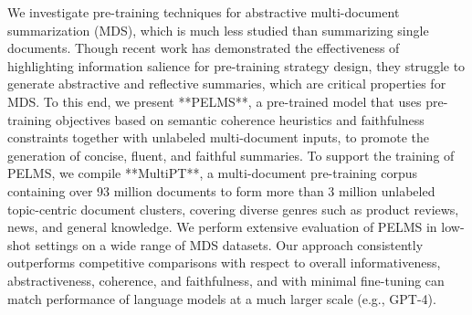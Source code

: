 We investigate pre-training techniques for abstractive multi-document summarization (MDS), which is much less studied than summarizing single documents. Though recent work has demonstrated the effectiveness of highlighting information salience for pre-training strategy design, they struggle to generate abstractive and reflective summaries, which are critical properties for MDS. To this end, we present **PELMS**, a pre-trained model that uses pre-training objectives based on semantic coherence heuristics and faithfulness constraints together with unlabeled multi-document inputs, to promote the generation of concise, fluent, and faithful summaries. To support the training of PELMS, we compile **MultiPT**, a multi-document pre-training corpus containing over 93 million documents to form more than 3 million unlabeled topic-centric document clusters, covering diverse genres such as product reviews, news, and general knowledge. We perform extensive evaluation of PELMS in low-shot settings on a wide range of MDS datasets. Our approach consistently outperforms competitive comparisons with respect to overall informativeness, abstractiveness, coherence, and faithfulness, and with minimal fine-tuning can match performance of language models at a much larger scale (e.g., GPT-4).